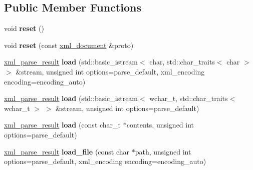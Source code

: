 \subsection*{Public Member Functions}
\begin{DoxyCompactItemize}
\item 
\hypertarget{classpugi_1_1xml__document_acf2b9daf1d12e12048796118b7a7685d}{void {\bfseries reset} ()}\label{classpugi_1_1xml__document_acf2b9daf1d12e12048796118b7a7685d}

\item 
\hypertarget{classpugi_1_1xml__document_a4230de3de88f4fe481c4c3d5312aa5cf}{void {\bfseries reset} (const \hyperlink{classpugi_1_1xml__document}{xml\-\_\-document} \&proto)}\label{classpugi_1_1xml__document_a4230de3de88f4fe481c4c3d5312aa5cf}

\item 
\hypertarget{classpugi_1_1xml__document_abb7db3882f94ac35b870510789a87778}{\hyperlink{structpugi_1_1xml__parse__result}{xml\-\_\-parse\-\_\-result} {\bfseries load} (std\-::basic\-\_\-istream$<$ char, std\-::char\-\_\-traits$<$ char $>$ $>$ \&stream, unsigned int options=parse\-\_\-default, xml\-\_\-encoding encoding=encoding\-\_\-auto)}\label{classpugi_1_1xml__document_abb7db3882f94ac35b870510789a87778}

\item 
\hypertarget{classpugi_1_1xml__document_a36131b6f1a80a1248666f4e7fe352685}{\hyperlink{structpugi_1_1xml__parse__result}{xml\-\_\-parse\-\_\-result} {\bfseries load} (std\-::basic\-\_\-istream$<$ wchar\-\_\-t, std\-::char\-\_\-traits$<$ wchar\-\_\-t $>$ $>$ \&stream, unsigned int options=parse\-\_\-default)}\label{classpugi_1_1xml__document_a36131b6f1a80a1248666f4e7fe352685}

\item 
\hypertarget{classpugi_1_1xml__document_ae17a77772fa21a40f3d91d9c79e60d0b}{\hyperlink{structpugi_1_1xml__parse__result}{xml\-\_\-parse\-\_\-result} {\bfseries load} (const char\-\_\-t $\ast$contents, unsigned int options=parse\-\_\-default)}\label{classpugi_1_1xml__document_ae17a77772fa21a40f3d91d9c79e60d0b}

\item 
\hypertarget{classpugi_1_1xml__document_aad350209a4a91589fbd7e8cdaf79e010}{\hyperlink{structpugi_1_1xml__parse__result}{xml\-\_\-parse\-\_\-result} {\bfseries load\-\_\-file} (const char $\ast$path, unsigned int options=parse\-\_\-default, xml\-\_\-encoding encoding=encoding\-\_\-auto)}\label{classpugi_1_1xml__document_aad350209a4a91589fbd7e8cdaf79e010}


\end{DoxyCompactItemize}
